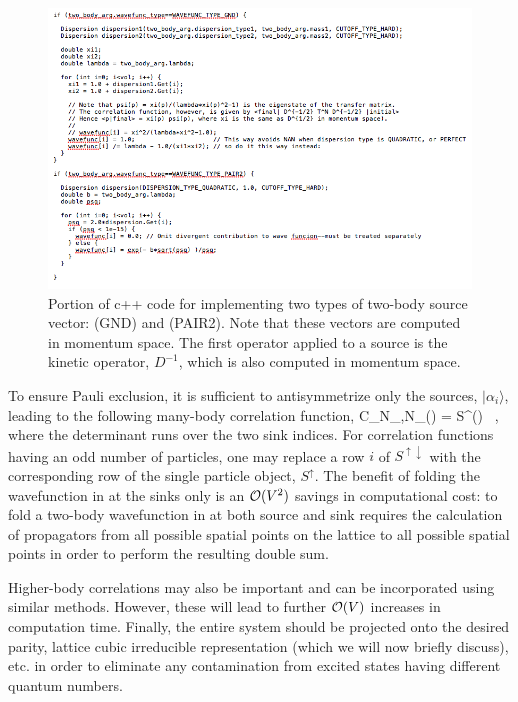 \begin{figure}
\caption{\label{fig:wfcode}Portion of c++ code for implementing two types of two-body source vector:  (GND) and  (PAIR2). Note that these vectors are computed in momentum space. The first operator applied to a source is the kinetic operator, $D^{-1}$, which is also computed in momentum space.}
\includegraphics[width=0.9\linewidth]{Chapter5-figures/twobody}
\end{figure}

To ensure Pauli exclusion, it is sufficient to antisymmetrize only the sources, $|\alpha_i \rangle$, leading to the following many-body correlation function,
\beq
C_{N_{\uparrow},N_{\downarrow}}(\tau) = \langle \det S^{\uparrow \downarrow}(\tau) \rangle \ ,
\eeq 
where the determinant runs over the two sink indices. For correlation functions having an odd number of particles, one may replace a row $i$ of $S^{\uparrow\downarrow}$ with the corresponding row of the single particle object, $S^{\uparrow}$. The benefit of folding the wavefunction in at the sinks only is an ${\mathcal{ O}}(V^2)$ savings in computational cost: to fold a two-body wavefunction in at both source and sink requires the calculation of propagators from all possible spatial points on the lattice to all possible spatial points in order to perform the resulting double sum. 

Higher-body correlations may also be important and can be incorporated using similar methods. However, these will lead to further ${\mathcal{ O}}(V)$ increases in computation time. Finally, the entire system should be projected onto the desired parity, lattice cubic irreducible representation (which we will now briefly discuss), etc. in order to eliminate any contamination from excited states having different quantum numbers. 

